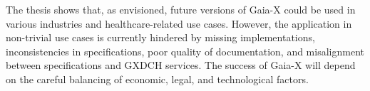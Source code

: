 The thesis shows that, as envisioned, future versions of Gaia-X could be used in various industries and healthcare-related use cases.
However, the application in non-trivial use cases is currently hindered by missing implementations, inconsistencies in specifications, poor quality of documentation, and misalignment between specifications and GXDCH services.
The success of Gaia-X will depend on the careful balancing of economic, legal, and technological factors.
